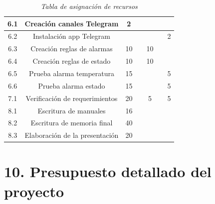 \documentclass[11pt]{charter}
\begin{document}
\begin{table}
{\begin{tabular}{|c|c|c|c|c|c|c|}
  6.1&Creación canales Telegram  & 2 &  &  &  &\\ \hline
 6.2&Instalación app Telegram &  &  &  &  &2\\ \hline
 6.3&Creación reglas de alarmas & 10 &  & 10 &  &\\ \hline
 6.4&Creación reglas de estado &  10 &  & 10 &  &\\ \hline
 6.5&Prueba alarma temperatura & 15 &  &  &  &5\\ \hline
 6.6&Prueba alarma estado & 15 &  &  &  &5\\ \hline
 7.1&Verificación de requerimientos & 20  &  &5  &  &5\\ \hline
 8.1&Escritura de manuales & 16 &  &  &  &\\ \hline
 8.2&Escritura de memoria final & 40 &  &  &  &\\ \hline
 8.3&Elaboración de la presentación & 20 &  &  &  &\\ \hline
 \end{tabular}%
 }
 \caption{\textit{Tabla de asignación de recursos}}
 \label{recursos1}
 \end{table}
 
\section{10. Presupuesto detallado del proyecto}
\label{sec:presupuesto}
\end{document}
